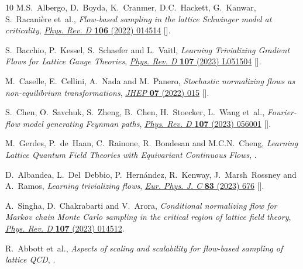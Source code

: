 \begin{thebibliography}{10}
M.S.~Albergo, D.~Boyda, K.~Cranmer, D.C.~Hackett, G.~Kanwar, S.~Racani{\`e}re
  et~al., \emph{Flow-based sampling in the lattice {{Schwinger}} model at
  criticality}, \href{https://doi.org/10.1103/PhysRevD.106.014514}{\emph{Phys.
  Rev. D} {\bfseries 106} (2022) 014514}
  [\href{https://arxiv.org/abs/2202.11712}{{}}].

S.~Bacchio, P.~Kessel, S.~Schaefer and L.~Vaitl, \emph{Learning {{Trivializing
  Gradient Flows}} for {{Lattice Gauge Theories}}},
  \href{https://doi.org/10.1103/PhysRevD.107.L051504}{\emph{Phys. Rev. D}
  {\bfseries 107} (2023) L051504}
  [\href{https://arxiv.org/abs/2212.08469}{{}}].

M.~Caselle, E.~Cellini, A.~Nada and M.~Panero, \emph{Stochastic normalizing
  flows as non-equilibrium transformations},
  \href{https://doi.org/10.1007/JHEP07(2022)015}{\emph{JHEP} {\bfseries 07}
  (2022) 015} [\href{https://arxiv.org/abs/2201.08862}{{}}].

S.~Chen, O.~Savchuk, S.~Zheng, B.~Chen, H.~Stoecker, L.~Wang et~al.,
  \emph{{Fourier-flow model generating Feynman paths}},
  \href{https://doi.org/10.1103/PhysRevD.107.056001}{\emph{Phys. Rev. D}
  {\bfseries 107} (2023) 056001}
  [\href{https://arxiv.org/abs/2211.03470}{{}}].

M.~Gerdes, P.~de~Haan, C.~Rainone, R.~Bondesan and M.C.N.~Cheng,
  \emph{{Learning Lattice Quantum Field Theories with Equivariant Continuous
  Flows}},  \href{https://arxiv.org/abs/2207.00283}{{}}.

D.~Albandea, L.~Del~Debbio, P.~Hern\'andez, R.~Kenway, J.~Marsh~Rossney and
  A.~Ramos, \emph{{Learning trivializing flows}},
  \href{https://doi.org/10.1140/epjc/s10052-023-11838-8}{\emph{Eur. Phys. J. C}
  {\bfseries 83} (2023) 676}
  [\href{https://arxiv.org/abs/2302.08408}{{}}].

A.~Singha, D.~Chakrabarti and V.~Arora, \emph{Conditional normalizing flow for
  {{Markov}} chain {{Monte Carlo}} sampling in the critical region of lattice
  field theory}, \href{https://doi.org/10.1103/PhysRevD.107.014512}{\emph{Phys.
  Rev. D} {\bfseries 107} (2023) 014512}.

R.~Abbott et~al., \emph{{Aspects of scaling and scalability for flow-based
  sampling of lattice QCD}},
  \href{https://arxiv.org/abs/2211.07541}{{}}.


\end{thebibliography}
